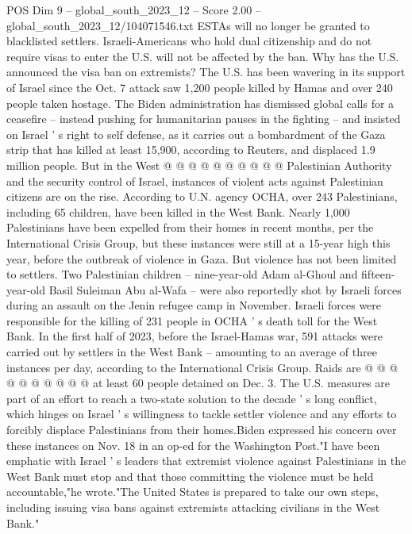 \begin{textsample}{POS Dim 9 – global\_south\_2023\_12 – Score 2.00 – global\_south\_2023\_12/104071546.txt}
ESTAs will no longer be granted to blacklisted settlers.
Israeli-Americans who hold dual citizenship and do not require visas to enter the U.S. will not be affected by the ban.
Why has the U.S. announced the visa ban on extremists?
The U.S. has been wavering in its support of Israel since the Oct. 7 attack saw 1,200 people killed by Hamas and over 240 people taken hostage.
The Biden administration has dismissed global calls for a ceasefire -- instead pushing for humanitarian pauses in the fighting -- and insisted on Israel ' s right to self defense, as it carries out a bombardment of the Gaza strip that has killed at least 15,900, according to Reuters, and displaced 1.9 million people.
But in the West @ @ @ @ @ @ @ @ @ @ Palestinian Authority and the security control of Israel, instances of violent acts against Palestinian citizens are on the rise.
According to U.N. agency OCHA, over 243 Palestinians, including 65 children, have been killed in the West Bank.
Nearly 1,000 Palestinians have been expelled from their homes in recent months, per the International Crisis Group, but these instances were still at a 15-year high this year, before the outbreak of violence in Gaza.
But violence has not been limited to settlers.
Two Palestinian children -- nine-year-old Adam al-Ghoul and fifteen-year-old Basil Suleiman Abu al-Wafa -- were also reportedly shot by Israeli forces during an assault on the Jenin refugee camp in November.
Israeli forces were responsible for the killing of 231 people in OCHA ' s death toll for the West Bank.
In the first half of 2023, before the Israel-Hamas war, 591 attacks were carried out by settlers in the West Bank -- amounting to an average of three instances per day, according to the International Crisis Group.
Raids are @ @ @ @ @ @ @ @ @ @ at least 60 people detained on Dec. 3.
The U.S. measures are part of an effort to reach a two-state solution to the decade ' s long conflict, which hinges on Israel ' s willingness to tackle settler violence and any efforts to forcibly displace Palestinians from their homes.Biden expressed his concern over these instances on Nov. 18 in an op-ed for the Washington Post."I have been emphatic with Israel ' s leaders that extremist violence against Palestinians in the West Bank must stop and that those committing the violence must be held accountable,"he wrote."The United States is prepared to take our own steps, including issuing visa bans against extremists attacking civilians in the West Bank."

\end{textsample}
